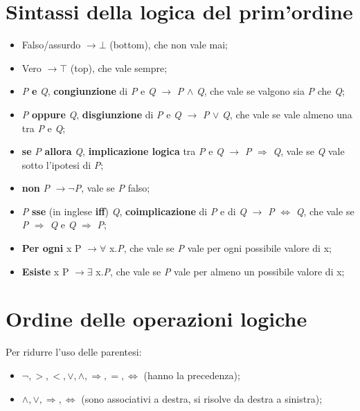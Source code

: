 \documentclass[12pt]{article}
\begin{document}
\section{Sintassi della logica del prim'ordine}
\begin{itemize}
    \item Falso/assurdo $\rightarrow \bot$ (bottom), che non vale mai;
    \item Vero $\rightarrow \top$ (top), che vale sempre;
    \item \textit{P} \textbf{e} \textit{Q}, \textbf{congiunzione} di \textit{P} e \textit{Q} $\rightarrow$ \textit{P} $\land$ \textit{Q}, che vale se valgono sia \textit{P} che \textit{Q};
    \item \textit{P} \textbf{oppure} \textit{Q}, \textbf{disgiunzione} di \textit{P} e \textit{Q} $\rightarrow$ \textit{P} $\lor$ \textit{Q}, che vale se vale almeno una tra \textit{P} e \textit{Q};
    \item \textbf{se} \textit{P} \textbf{allora} \textit{Q}, \textbf{implicazione logica} tra \textit{P} e \textit{Q} $\rightarrow$ \textit{P} $\Rightarrow$ \textit{Q}, vale se \textit{Q} vale sotto l'ipotesi di \textit{P};
    \item \textbf{non} \textit{P} $\rightarrow \neg$\textit{P}, vale se \textit{P} falso;
    \item \textit{P} \textbf{sse} (in inglese \textbf{iff}) \textit{Q}, \textbf{coimplicazione} di \textit{P} e di \textit{Q} $\rightarrow$ \textit{P} $\Leftrightarrow$ \textit{Q}, che vale se \textit{P} $\Rightarrow$ \textit{Q} e \textit{Q} $\Rightarrow$ \textit{P};
    \item \textbf{Per ogni} x P $\rightarrow \forall$ x.\textit{P}, che vale se \textit{P} vale per ogni possibile valore di x;
    \item \textbf{Esiste} x P $\rightarrow \exists$ x.\textit{P}, che vale se \textit{P} vale per almeno un possibile valore di x;  
\end{itemize}
\section{Ordine delle operazioni logiche}
Per ridurre l'uso delle parentesi:
\begin{itemize}
    \item $\neg, >, <, \lor, \land, \Rightarrow, =, \Leftrightarrow$ (hanno la precedenza);
    \item $\land, \lor, \Rightarrow, \Leftrightarrow$ (sono associativi a destra, si risolve da destra a sinistra); 
\end{itemize}
\end{document}
